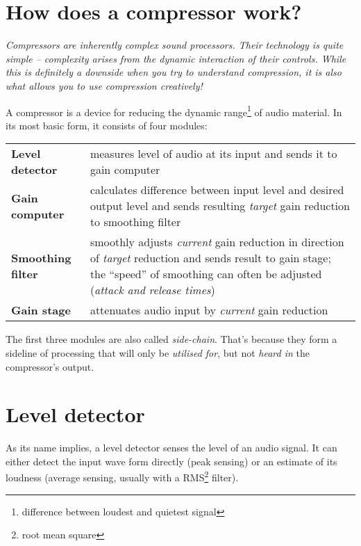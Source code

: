 \section{How does a compressor work?}
\label{sec:how_does_a_compressor_work}

\emph{Compressors are inherently complex sound processors.  Their
  technology is quite simple -- complexity arises from the dynamic
  interaction of their controls.  While this is definitely a downside
  when you try to understand compression, it is also what allows you
  to use compression creatively!}

A compressor is a device for reducing the dynamic
range\footnote{difference between loudest and quietest signal} of audio
material.  In its most basic form, it consists of four modules:

\begin{tabular}{p{}p{}}

  \textbf{Level detector} &
  measures level of audio at its input and sends it to gain
  computer \\

  \textbf{Gain computer} &
  calculates difference between input level and desired output level
  and sends resulting \emph{target} gain reduction to smoothing
  filter \\

  \textbf{Smoothing filter} &
  smoothly adjusts \emph{current} gain reduction in direction of
  \emph{target} reduction and sends result to gain stage; the
  ``speed'' of smoothing can often be adjusted (\emph{attack and
    release times}) \\

  \textbf{Gain stage} &
  attenuates audio input by \emph{current} gain reduction \\

\end{tabular}

The first three modules are also called \emph{side-chain}.  That's
because they form a sideline of processing that will only be
\emph{utilised for}, but not \emph{heard in} the compressor's output.

\section{Level detector}
\label{sec:level_detector}

As its name implies, a level detector senses the level of an audio
signal.  It can either detect the input wave form directly (peak
sensing) or an estimate of its loudness (average sensing, usually with
a RMS\footnote{root mean square} filter).

